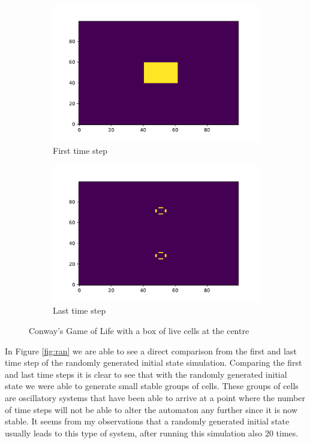 \documentclass{article}
\begin{document}
\begin{figure}[H]
\centering
\begin{subfigure}{.5\textwidth}
    \centering
    \includegraphics[scale=0.4]{Conway_Box_FIRST.pdf}
    \caption{First time step}\label{fig:box_first}
\end{subfigure}
\begin{subfigure}{.5\textwidth}
    \centering
    \includegraphics[scale=0.4]{Conway_Box_LAST.pdf}
    \caption{Last time step}\label{fig:box_last}
\end{subfigure}
\caption{Conway's Game of Life with a box of live cells at the centre}\label{fig:box}
\end{figure}

In Figure \ref{fig:ran} we are able to see a direct comparison from the first and last time step of the randomly generated initial state simulation. Comparing the first and last time steps it is clear to see that with the randomly generated initial state we were able to generate small stable groups of cells. These groups of cells are oscillatory systems that have been able to arrive at a point where the number of time steps will not be able to alter the automaton any further since it is now stable. It seems from my observations that a randomly generated initial state usually leads to this type of system, after running this simulation also 20 times. 
\end{document}
